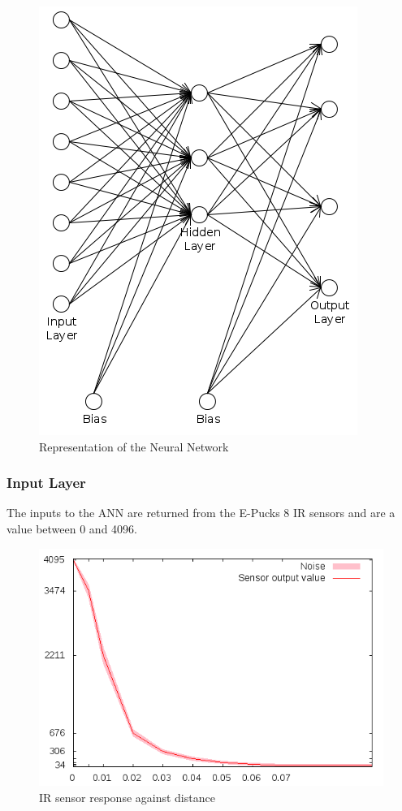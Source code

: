 \begin{figure}[h]
\begin{center}
\includegraphics[scale=0.3]{Chapter2/images/network.png}
\end{center}
\caption{Representation of the Neural Network}
\label{fig:ann}
\end{figure}


\subsubsection{Input Layer}
The inputs to the ANN are returned from the E-Pucks 8 IR sensors and are a value between 0 and 4096.\\

\begin{figure}[h]
\begin{center}
\includegraphics[scale=0.3]{Chapter2/images/Selection_002.png} 
\caption[IR sensor response against distance]{IR sensor response against distance\footnotemark}
\label{fig:ir_distance}
\end{center}
\end{figure} 

